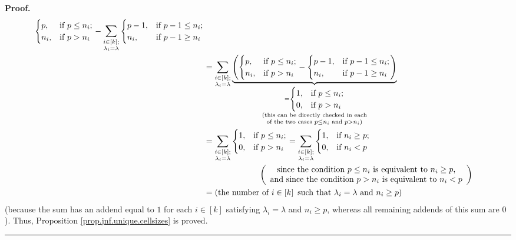 \documentclass[numbers=enddot,12pt,final,onecolumn,notitlepage]{scrartcl}%
\numberwithin{exer}{subsection}
\theoremstyle{definition}
\newenvironment{proof}[1][Proof]{\noindent\textbf{#1.} }{\ \rule{0.5em}{0.5em}}
\let\sumnonlimits\sum
\renewcommand{\sum}{\sumnonlimits\limits}
\begin{document}
\begin{proof}
\begin{align*}
\begin{cases}
p, & \text{if }p\leq n_{i};\\
n_{i}, & \text{if }p>n_{i}%
\end{cases}
-\sum_{\substack{i\in\left[  k\right]  ;\\\lambda_{i}=\lambda}}%
\begin{cases}
p-1, & \text{if }p-1\leq n_{i};\\
n_{i}, & \text{if }p-1\geq n_{i}%
\end{cases}
\\
&  =\sum_{\substack{i\in\left[  k\right]  ;\\\lambda_{i}=\lambda
}}\underbrace{\left(
\begin{cases}
p, & \text{if }p\leq n_{i};\\
n_{i}, & \text{if }p>n_{i}%
\end{cases}
-%
\begin{cases}
p-1, & \text{if }p-1\leq n_{i};\\
n_{i}, & \text{if }p-1\geq n_{i}%
\end{cases}
\right)  }_{\substack{=%
\begin{cases}
1, & \text{if }p\leq n_{i};\\
0, & \text{if }p>n_{i}%
\end{cases}
\\\text{(this can be directly checked in each}\\\text{of the two cases }p\leq
n_{i}\text{ and }p>n_{i}\text{)}}}\\
&  =\sum_{\substack{i\in\left[  k\right]  ;\\\lambda_{i}=\lambda}}%
\begin{cases}
1, & \text{if }p\leq n_{i};\\
0, & \text{if }p>n_{i}%
\end{cases}
=\sum_{\substack{i\in\left[  k\right]  ;\\\lambda_{i}=\lambda}}%
\begin{cases}
1, & \text{if }n_{i}\geq p;\\
0, & \text{if }n_{i}<p
\end{cases}
\\
&  \ \ \ \ \ \ \ \ \ \ \ \ \ \ \ \ \ \ \ \ \left(
\begin{array}
[c]{c}%
\text{since the condition }p\leq n_{i}\text{ is equivalent to }n_{i}\geq
p\text{,}\\
\text{and since the condition }p>n_{i}\text{ is equivalent to }n_{i}<p
\end{array}
\right) \\
&  =\left(  \text{the number of }i\in\left[  k\right]  \text{ such that
}\lambda_{i}=\lambda\text{ and }n_{i}\geq p\right)
\end{align*}
(because the sum has an addend equal to $1$ for each $i\in\left[  k\right]  $
satisfying $\lambda_{i}=\lambda$ and $n_{i}\geq p$, whereas all remaining
addends of this sum are $0$). Thus, Proposition
\ref{prop.jnf.unique.cellsizes} is proved.
\end{proof}
\end{document}
